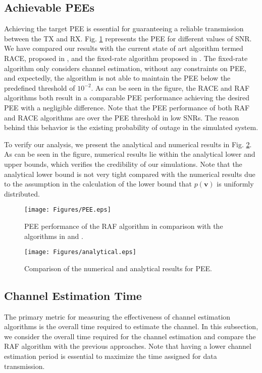 \documentclass{ieeeaccess}
\begin{document}
\subsection{Achievable PEEs}
Achieving the target PEE is essential for guaranteeing a reliable transmission between the TX and RX. Fig. \ref{pee} represents the PEE for different values of SNR. We have compared our results with the current state of art algorithm termed RACE, proposed in \cite{RACE}, and the fixed-rate algorithm proposed in \cite{RH}. The fixed-rate algorithm only considers channel estimation, without any constraints on PEE, and expectedly, the algorithm is not able to maintain the PEE below the predefined threshold of $10^{-2}$. As can be seen in the figure, the RACE and RAF algorithms both result in a comparable PEE performance achieving the desired PEE with a negligible difference. Note that the PEE performance of both RAF and RACE algorithms are over the PEE threshold in low SNRs. The reason behind this behavior is the existing probability of outage in the simulated system.

To verify our analysis, we present the analytical and numerical results in Fig. \ref{Analytical}. As can be seen in the figure, numerical results lie within the analytical lower and upper bounds, which verifies the credibility of our simulations. Note that the analytical lower bound is not very tight compared with the numerical results due to the assumption in the calculation of the lower bound that $p(\boldsymbol{v})$ is uniformly distributed.


\begin{figure}[t!]
\centering
\texttt{[image: Figures/PEE.eps]}
\caption{PEE performance of the RAF algorithm in comparison with the algorithms in \cite{RACE} and \cite{RH}.}
\label{pee}
\end{figure}




\begin{figure}[t!]
\centering
\texttt{[image: Figures/analytical.eps]}
\caption{Comparison of the numerical and analytical results for PEE.}
\label{Analytical}
\end{figure}

\subsection{Channel Estimation Time}\label{Overall duration of channel estimation}
The primary metric for measuring the effectiveness of channel estimation algorithms is the overall time required to estimate the channel. In this subsection, we consider the overall time required for the channel estimation and compare the RAF algorithm with the previous approaches. Note that having a lower channel estimation period is essential to maximize the time assigned for data transmission.
\end{document}
